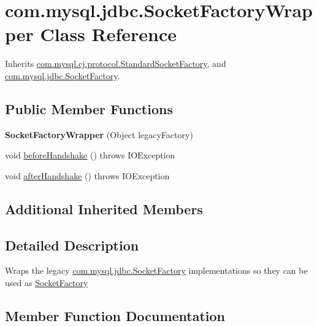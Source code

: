 \hypertarget{classcom_1_1mysql_1_1jdbc_1_1_socket_factory_wrapper}{}\section{com.\+mysql.\+jdbc.\+Socket\+Factory\+Wrapper Class Reference}
\label{classcom_1_1mysql_1_1jdbc_1_1_socket_factory_wrapper}


Inherits \mbox{\hyperlink{classcom_1_1mysql_1_1cj_1_1protocol_1_1_standard_socket_factory}{com.\+mysql.\+cj.\+protocol.\+Standard\+Socket\+Factory}}, and \mbox{\hyperlink{interfacecom_1_1mysql_1_1jdbc_1_1_socket_factory}{com.\+mysql.\+jdbc.\+Socket\+Factory}}.

\subsection*{Public Member Functions}
\begin{DoxyCompactItemize}
\item 
\mbox{\label{classcom_1_1mysql_1_1jdbc_1_1_socket_factory_wrapper_ae99060438754f84f9f177f772fc32feb}} 
{\bfseries Socket\+Factory\+Wrapper} (Object legacy\+Factory)
\item 
void \mbox{\hyperlink{classcom_1_1mysql_1_1jdbc_1_1_socket_factory_wrapper_a6c39038cbdf685cde6e0ce84cecde918}{before\+Handshake}} ()  throws I\+O\+Exception 
\item 
void \mbox{\hyperlink{classcom_1_1mysql_1_1jdbc_1_1_socket_factory_wrapper_ab7dde0fd740255950d83759b418fd2ff}{after\+Handshake}} ()  throws I\+O\+Exception 
\end{DoxyCompactItemize}
\subsection*{Additional Inherited Members}


\subsection{Detailed Description}
Wraps the legacy \mbox{\hyperlink{interfacecom_1_1mysql_1_1jdbc_1_1_socket_factory}{com.\+mysql.\+jdbc.\+Socket\+Factory}} implementations so they can be used as \mbox{\hyperlink{interfacecom_1_1mysql_1_1jdbc_1_1_socket_factory}{Socket\+Factory}} 

\subsection{Member Function Documentation}
\mbox{\label{classcom_1_1mysql_1_1jdbc_1_1_socket_factory_wrapper_ab7dde0fd740255950d83759b418fd2ff}} 
